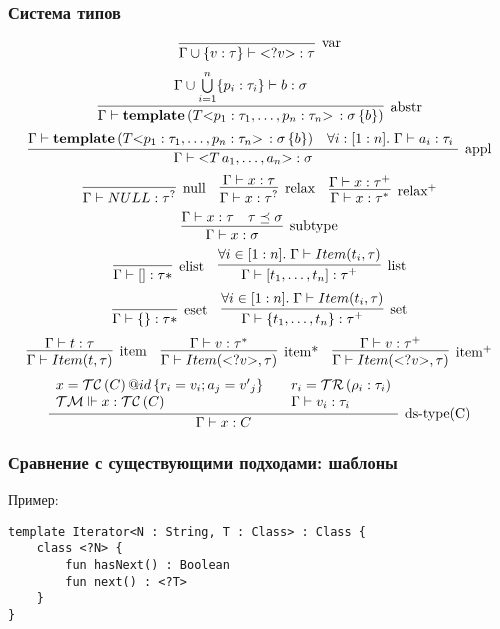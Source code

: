 \documentclass{beamer}
\makeatletter
\newcommand{\ang}[1]{\mathsf{<}#1\mathsf{>}}
\newcommand{\subtype}{\preceq}
\newcommand{\myinfer}[3][]{\infer[\mbox{#1}]{#2}{#3}}
\newcommand{\trule}[3]{%
\myinfer[#3]{#2}{#1}%
}%
\newcommand{\obj}[3]{#1@#2\left\{#3\right\}}%
\makeatother
\begin{document}
\begin{frame}[fragile]
	\frametitle{Система типов}
\scriptsize
$$
\trule{}{\Gamma \cup \{v : \tau\} \vdash \ang{?v} : \tau}{var}
$$ 
$$
\trule{
	\Gamma \cup \bigcup\limits_{i=1}^{n} \{ p_i : \tau_i \} \vdash b : \sigma
}{
	\Gamma \vdash \mathbf{template}\left(
		T \ang{p_1 : \tau_1, \ldots, p_n : \tau_n} \,: \sigma \, \{ b \}
	\right)
}{abstr}
$$
$$
\trule{
	\Gamma \vdash \mathbf{template}\left(
		T \ang{p_1 : \tau_1, \ldots, p_n : \tau_n} \,: \sigma \, \{ b \}
	\right)
	&
	\forall i : [1:n].\; \Gamma \vdash a_i : \tau_i \
}{
	\Gamma \vdash \ang{T \, a_1, \ldots, a_n} : \sigma
}{appl}
$$
$$
\myinfer[null]{
	\Gamma \vdash NULL : \tau^?
}{}
\quad
\myinfer[relax]{
	\Gamma \vdash x : \tau^?
}{
	\Gamma \vdash x : \tau
}
\quad
\myinfer[relax$^+$]{
	\Gamma \vdash x : \tau^*
}{
	\Gamma \vdash x : \tau^+
}
$$
$$
\myinfer[subtype]{
	\Gamma \vdash x : \sigma
}{
	\Gamma \vdash x : \tau &
	\tau \subtype \sigma
}
$$
$$
\myinfer[elist]{\Gamma \vdash [] : \tau*}{}
\quad
\myinfer[list]{
	\Gamma \vdash [t_1,\ldots,t_n] : \tau^+
}{
	\forall i \in [1:n].\; \Gamma \vdash Item(t_i, \tau)
}
$$
$$
\myinfer[eset]{\Gamma \vdash \{\} : \tau*}{}
\quad
\myinfer[set]{
	\Gamma \vdash \{t_1,\ldots,t_n\} : \tau^+
}{
	\forall i \in [1:n].\; \Gamma \vdash Item(t_i, \tau)
}
$$
$$
\myinfer[item]{
	\Gamma \vdash Item(t, \tau)
}{
	\Gamma \vdash t : \tau
}
\quad
\myinfer[item*]{
	\Gamma \vdash Item(\ang{?v}, \tau)
}{
	\Gamma \vdash v : \tau^*
}
\quad
\myinfer[item$^+$]{
	\Gamma \vdash Item(\ang{?v}, \tau)
}{
	\Gamma \vdash v : \tau^+
}
$$
$$
\myinfer[\mbox{ds-type(C)}]{
	\Gamma \vdash x : C
}{
	\begin{array}{l}
	x = \obj{\TC{C}}{id}{r_i = v_i; a_j = {v'}_j}\\
	\TM \Vdash x : \TC{C} 
	\end{array}	
	&
	\begin{array}{l}
	r_i = \TR{\rho_i : \tau_i}\\
	\Gamma \vdash v_i : \tau_i\\
	\end{array}	
}
$$
\end{frame}

\begin{frame}[fragile]
	\frametitle{Сравнение с существующими подходами: шаблоны}
	

Пример:
\begin{lstlisting}
template Iterator<N : String, T : Class> : Class {
    class <?N> {
        fun hasNext() : Boolean
        fun next() : <?T>
    }
}
\end{lstlisting}
\end{frame}
\end{document}

